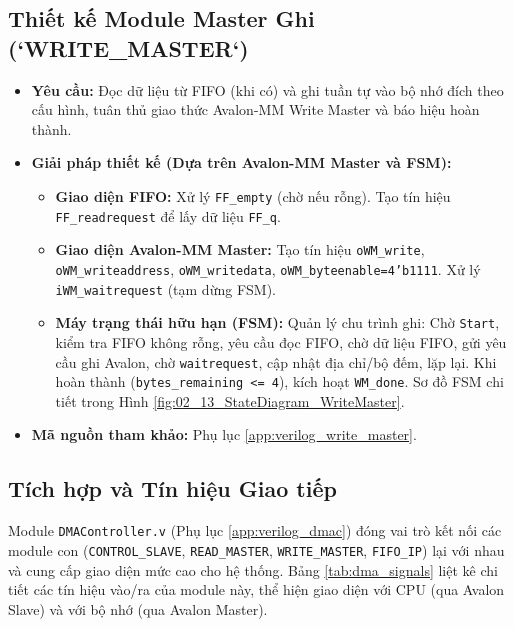 \subsection{Thiết kế Module Master Ghi (`WRITE\_MASTER`)}
\begin{itemize}
    \item \textbf{Yêu cầu:} Đọc dữ liệu từ FIFO (khi có) và ghi tuần tự vào bộ nhớ đích theo cấu hình, tuân thủ giao thức Avalon-MM Write Master và báo hiệu hoàn thành.
    \item \textbf{Giải pháp thiết kế (Dựa trên Avalon-MM Master và FSM):}
        \begin{itemize}
            \item \textbf{Giao diện FIFO:} Xử lý \texttt{FF\_empty} (chờ nếu rỗng). Tạo tín hiệu \texttt{FF\_readrequest} để lấy dữ liệu \texttt{FF\_q}.
            \item \textbf{Giao diện Avalon-MM Master:} Tạo tín hiệu \texttt{oWM\_write}, \texttt{oWM\_writeaddress}, \texttt{oWM\_writedata}, \texttt{oWM\_byteenable=4'b1111}. Xử lý \texttt{iWM\_waitrequest} (tạm dừng FSM).
            \item \textbf{Máy trạng thái hữu hạn (FSM):} Quản lý chu trình ghi: Chờ \texttt{Start}, kiểm tra FIFO không rỗng, yêu cầu đọc FIFO, chờ dữ liệu FIFO, gửi yêu cầu ghi Avalon, chờ \texttt{waitrequest}, cập nhật địa chỉ/bộ đếm, lặp lại. Khi hoàn thành (\texttt{bytes\_remaining <= 4}), kích hoạt \texttt{WM\_done}. Sơ đồ FSM chi tiết trong Hình \ref{fig:02_13_StateDiagram_WriteMaster}.
        \end{itemize}
    \item \textbf{Mã nguồn tham khảo:} Phụ lục \ref{app:verilog_write_master}.
\end{itemize}

\subsection{Tích hợp và Tín hiệu Giao tiếp}
Module \texttt{DMAController.v} (Phụ lục \ref{app:verilog_dmac}) đóng vai trò kết nối các module con (\texttt{CONTROL\_SLAVE}, \texttt{READ\_MASTER}, \texttt{WRITE\_MASTER}, \texttt{FIFO\_IP}) lại với nhau và cung cấp giao diện mức cao cho hệ thống. Bảng \ref{tab:dma_signals} liệt kê chi tiết các tín hiệu vào/ra của module này, thể hiện giao diện với CPU (qua Avalon Slave) và với bộ nhớ (qua Avalon Master).

